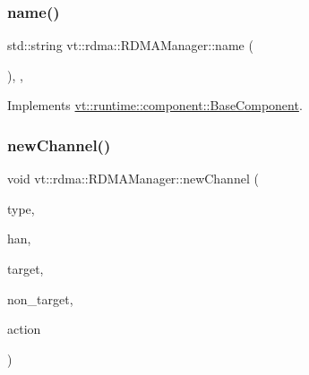 \mbox{\label{structvt_1_1rdma_1_1_r_d_m_a_manager_add0f236b62fd550b8eb3d78156a97403}} 
\subsubsection{\texorpdfstring{name()}{name()}}
{\footnotesize\ttfamily std\+::string vt\+::rdma\+::\+R\+D\+M\+A\+Manager\+::name (\begin{DoxyParamCaption}{ }\end{DoxyParamCaption})\hspace{0.3cm}{\ttfamily [inline]}, {\ttfamily [override]}, {\ttfamily [virtual]}}



Implements \hyperlink{structvt_1_1runtime_1_1component_1_1_base_component_a7701485f3539f78d42e6bad47fc7eb78}{vt\+::runtime\+::component\+::\+Base\+Component}.

\mbox{\label{structvt_1_1rdma_1_1_r_d_m_a_manager_add2a57acf8b38758b2e53f71d92d452a}} 
\subsubsection{\texorpdfstring{new\+Channel()}{newChannel()}}
{\footnotesize\ttfamily void vt\+::rdma\+::\+R\+D\+M\+A\+Manager\+::new\+Channel (\begin{DoxyParamCaption}\item[{\hyperlink{namespacevt_1_1rdma_ac848e1d9da43db6294bd06f83e5d3946}{R\+D\+M\+A\+\_\+\+Type\+Type} const \&}]{type,  }\item[{\hyperlink{namespacevt_a10442579ec4e7ebef223818e64bcf908}{R\+D\+M\+A\+\_\+\+Handle\+Type} const \&}]{han,  }\item[{\hyperlink{namespacevt_a866da9d0efc19c0a1ce79e9e492f47e2}{Node\+Type} const \&}]{target,  }\item[{\hyperlink{namespacevt_a866da9d0efc19c0a1ce79e9e492f47e2}{Node\+Type} const \&}]{non\+\_\+target,  }\item[{\hyperlink{namespacevt_ae0a5a7b18cc99d7b732cb4d44f46b0f3}{Action\+Type} const \&}]{action }\end{DoxyParamCaption})}

